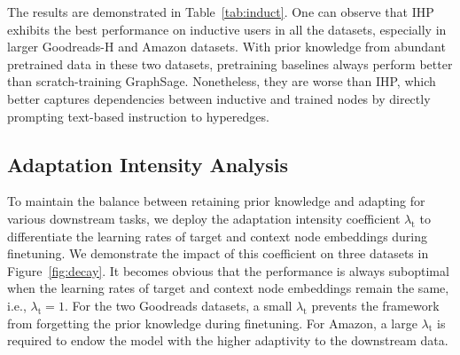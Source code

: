 The results are demonstrated in Table~\ref{tab:induct}. 
One can observe that IHP exhibits the best performance on inductive users in all the datasets, especially in larger Goodreads-H and Amazon datasets. 
With prior knowledge from abundant pretrained data in these two datasets, pretraining baselines always perform better than scratch-training GraphSage. 
Nonetheless, they are worse than IHP, which better captures dependencies between inductive and trained nodes by directly prompting text-based instruction to hyperedges.

\begin{table}[]
\caption{Performance of IHP on inductive user nodes.}\label{tab:induct}
\end{table}



\subsection{Adaptation Intensity Analysis}
To maintain the balance between retaining prior knowledge and adapting for various downstream tasks, we deploy the adaptation intensity coefficient $\lambda_\text{t}$ to differentiate the learning rates of target and context node embeddings during finetuning. 
We demonstrate the impact of this coefficient on three datasets in Figure~\ref{fig:decay}. 
It becomes obvious that the performance is always suboptimal when the learning rates of target and context node embeddings remain the same, i.e., $\lambda_\text{t}=1$. For the two Goodreads datasets, a small $\lambda_\text{t}$ prevents the framework from forgetting the prior knowledge during finetuning. 
For Amazon, a large $\lambda_\text{t}$ is required to endow the model with the higher adaptivity to the downstream data. 

